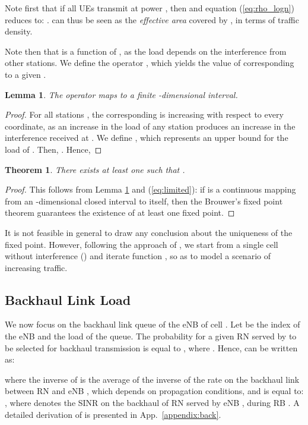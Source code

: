 \documentclass[draftcls,onecolumn]{IEEEtran}
\theoremstyle{plain}
\newtheorem{lemma}{Lemma}
\newtheorem{theorem}{Theorem}
\theoremstyle{definition}
\begin{document}
Note first that if all UEs transmit at power , then  and equation (\ref{eq:rho_logn}) reduces to: .  can thus be seen as the {\it effective area} covered by , in terms of traffic density.


Note then that  is a function of , as the load depends on the interference from other stations. 
We define the operator , which yields the value of  corresponding to a given .

\begin{lemma} \label{lm:finite}
The operator  maps  to a finite -dimensional interval.
\end{lemma}
\begin{proof}
For all stations , the corresponding  is increasing with respect to every coordinate, as an increase in the load of any station  produces an increase in the interference received at .
We define , which represents an upper bound for the load of . Then, .
Hence, 
 
\end{proof}
\begin{theorem}
There exists at least one  such that .
\end{theorem}
\begin{proof}
This follows from Lemma \ref{lm:finite} and (\ref{eq:limited}): if  is a continuous mapping from an -dimensional closed interval to itself, then the Brouwer's fixed point theorem guarantees the existence of at least one fixed point.
\end{proof}

It is not feasible in general to draw any conclusion about the uniqueness of the fixed point. However, following the approach of \cite{Rong11}, we start from a single cell without interference () and iterate function , so as to model a scenario of increasing traffic.  

\subsection{Backhaul Link Load} \label{subsec:bhload}
We now focus on the backhaul link queue of the eNB of cell . Let  be the index of the eNB and  the load of the queue. The probability for a given RN  served by  to be selected for backhaul transmission is equal to , where . Hence,  can be written as:

where the inverse of  is the average of the inverse of the rate on the backhaul link between RN  and eNB , which depends on propagation conditions, and is equal to:
,
where  denotes the SINR on the backhaul of RN  served by eNB , during RB .  
A detailed derivation of  is presented in App.~\ref{appendix:back}. 
\end{document}
